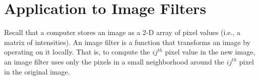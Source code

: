 \section*{Application to Image Filters}
Recall that a computer stores an image as a 2-D array of pixel values (i.e., a matrix of intensities).
An image filter is a function that transforms an image by operating on it locally.
That is, to compute the $ij^{th}$ pixel value in the new image, an image filter uses only the pixels in a small neighborhood around the $ij^{th}$ pixel in the original image.

